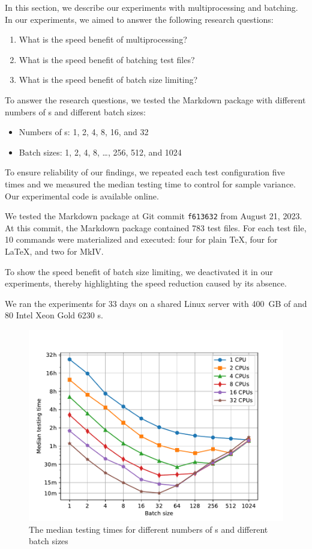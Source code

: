 \documentclass[final]{ltugboat}
\begin{document}
In this section, we describe our experiments with multiprocessing and batching. In our experiments, we aimed to answer the following research questions:
\begin{enumerate}
\item What is the speed benefit of multiprocessing?
\item What is the speed benefit of batching test files?
\item What is the speed benefit of batch size limiting?
\end{enumerate}

To answer the research questions, we tested the Markdown package with different numbers of s and different batch sizes:
\begin{itemize}
\item Numbers of s: 1, 2, 4, 8, 16, and 32
\item Batch sizes: 1, 2, 4, 8, \ldots, 256, 512, and 1024
\end{itemize}
To ensure reliability of our findings, we repeated each test configuration five times and we measured the median testing time to control for sample variance. Our experimental code is available online.~\cite{starynovotny2023measure}

We tested the Markdown package at Git commit \texttt{f613632} from August 21, 2023. At this commit, the Markdown package contained 783 test files. For each test file, 10 commands were materialized and executed: four for plain \TeX, four for \LaTeX, and two for  MkIV.

To show the speed benefit of batch size limiting, we deactivated it in our experiments, thereby highlighting the speed reduction caused by its absence.

We ran the experiments for 33 days on a shared Linux server with 400~GB of  and 80 Intel Xeon Gold 6230 s.

\begin{figure}
\includegraphics[trim={0.5cm 0.3cm 1.6cm 1.4cm}, clip, width=\linewidth]{images/speed-tests}
\caption{The median testing times for different numbers of s and different batch sizes}
\label{fig:results}
\end{figure}
\end{document}
